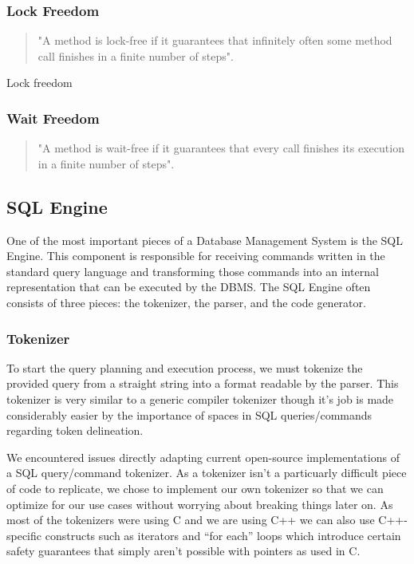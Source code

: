 \documentclass[letterpaper, 12pt]{article}
\begin{document}
\subsubsection{Lock Freedom}
\begin{quotation}
	"A method is lock-free if it guarantees that infinitely often some method call finishes in a finite number of steps"\citep[p. 60]{artofmulti}.
\end{quotation}

Lock freedom 

\subsubsection{Wait Freedom}
\begin{quotation}
	"A method is wait-free if it guarantees that every call finishes its execution
	in a finite number of steps"\citep[p. 59]{artofmulti}.
\end{quotation}

\newpage


\subsection{SQL Engine}
One of the most important pieces of a Database Management System is the SQL Engine. 
This component is responsible for receiving commands written in the standard query
language and transforming those commands into an internal representation that can be
executed by the DBMS. The SQL Engine often consists of three pieces: the tokenizer, the
parser, and the code generator.


\subsubsection{Tokenizer}
To start the query planning and execution process, we must tokenize the provided query
from a straight string into a format readable by the parser. This tokenizer is very
similar to a generic compiler tokenizer though it's job is made considerably easier 
by the importance of spaces in SQL queries/commands regarding token delineation.
\par\vspace{\baselineskip}
We encountered issues directly adapting current open-source implementations of a
SQL query/command tokenizer. As a tokenizer isn't a particuarly difficult piece of 
code to replicate, we chose to implement our own tokenizer so that
we can optimize for our use cases without worrying about breaking things later on.
As most of the tokenizers were using C and we are using C++ we can also use C++-specific
constructs such as iterators and ``for each'' loops which introduce certain safety guarantees 
that simply aren't possible with pointers as used in C.
\end{document}
